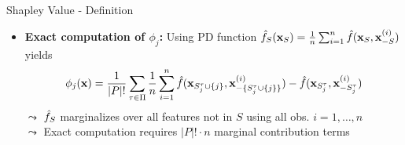 \documentclass[10pt,compress,t,notes=noshow, xcolor=table]{beamer}
\newcommand{\Sm}{S_m}%
\newcommand{\Smj}{\Sm \cup \{j\}}
\newcommand{\Stau}{S_{j}^\tau}%
\newcommand{\Stauj}{\Stau \cup \{j\}}
\newcommand{\minusStauj}{- \{\Stau \cup \{j\} \} }
\begin{document}
\begin{frame}{Shapley Value - Definition  }
\begin{itemize}
  $\leadsto$ Marginal contributions and Shapley values can be negative
   \item \textbf{Exact computation of $\phi_j$:} Using PD function 
   $\hat{f}_{S}(\mathbf{x}_S) = \frac{1}{n} \sum_{i=1}^n \hat{f}(\mathbf{x}_S, \mathbf{x}_{-S}^{(i)})$ 
   yields
    $$ \phi_j(\xv) = \frac{1}{|P|!} \sum_{\tau \in \Pi} \frac{1}{n} \sum_{i = 1}^n
   \fh(\xv_{\Stauj}, \xv_{\minusStauj}^{(i)}) - \fh(\xv_{\Stau}, \xv_{- \Stau}^{(i)})
   $$
   $\leadsto$ $\hat{f}_S$ marginalizes over all features not in $S$ using all obs. $i = 1, \ldots, n$\\
   $\leadsto$ Exact computation requires $|P|! \cdot n$ marginal contribution terms
   
\end{itemize}
\lz

\end{frame}
\end{document}
